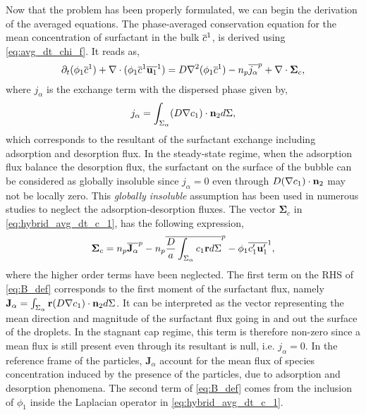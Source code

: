 Now that the problem has been properly formulated, we can begin the derivation of the averaged equations.
The phase-averaged conservation equation for the mean concentration of surfactant in the bulk $\overline{c}^1$, is derived using \ref{eq:avg_dt_chi_f}.
It reads as,
\begin{equation}
    \partial_t (\phi_1 \overline{c}^1)
    + \mathbf{\nabla} \cdot (\phi_1 \overline{c}^1 \overline{\textbf{u}_1}^1)
    = D \mathbf{\nabla}^2 (\phi_1\overline{c}^1)
    - n_p\overline{j_\alpha}^{p}
    +  \mathbf{\nabla} \cdot \mathbf{\Sigma}_c,
    \label{eq:hybrid_avg_dt_c_1}
\end{equation}
where $j_\alpha$ is the exchange term with the dispersed phase given by,
\begin{equation*}
    j_\alpha
    =\int_{\Sigma_\alpha}
    (D\mathbf{\nabla} c_1 )
\cdot \textbf{n}_2d\Sigma,
\end{equation*}
which corresponds to the resultant of the surfactant exchange including adsorption and desorption flux.  
In the steady-state regime, when the adsorption flux balance the desorption flux,  the surfactant on the surface of the bubble can be considered as globally insoluble since $j_\alpha=0$ even through $D(\mathbf{\nabla} c_1 ) \cdot \textbf{n}_2$ may not be locally zero. 
This \textit{globally insoluble} assumption has been used in numerous studies to neglect the adsorption-desorption fluxes. 
The vector $\mathbf{\Sigma}_c$ in \ref{eq:hybrid_avg_dt_c_1}, has the following expression,
\begin{equation}
    \mathbf{\Sigma}_c
    =
     n_p\overline{\textbf{J}_\alpha}^{p}
    - n_p\overline{\frac{D}{a}\int_{\Sigma_\alpha}  c_1 \textbf{r} d\Sigma}^{p}
    - \phi_1\overline{c'_1\textbf{u}_1'}^1,
    \label{eq:B_def}
\end{equation}
where the higher order terms have been neglected. 
The first term on the RHS of \ref{eq:B_def} corresponds to the first moment of the surfactant flux, namely $\textbf{J}_\alpha = \int_{\Sigma_\alpha} \textbf{r}
(D\mathbf{\nabla} c_1)\cdot \textbf{n}_2d\Sigma$.
It can be interpreted as the vector representing the mean direction and magnitude of the surfactant flux going in and out the surface of the droplets.
In the stagnant cap regime, this term is therefore non-zero since a mean flux is still present even through its resultant is null, i.e. $j_\alpha=0$.
In the reference frame of the particles, $\textbf{J}_\alpha$ account for the mean flux of species concentration induced by the presence of the particles, due to adsorption and desorption phenomena. 
The second term of \ref{eq:B_def} comes from the inclusion of $\phi_1$ inside the Laplacian operator in \ref{eq:hybrid_avg_dt_c_1}.
